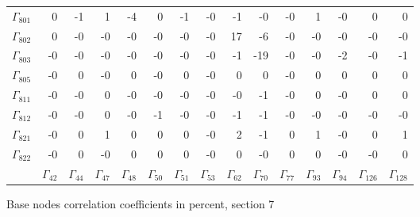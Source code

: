 {\begin{table}
\begin{center}
\begin{minipage}{\linewidth}
\begin{center}
\begin{envsmall}
\begin{center}
\begin{tabular}{rrrrrrrrrrrrrrr}
\( \Gamma_{801} \) &    0 &   -1 &    1 &   -4 &    0 &   -1 &   -0 &   -1 &   -0 &   -0 &    1 &   -0 &    0 &    0 \\
\( \Gamma_{802} \) &    0 &   -0 &   -0 &   -0 &   -0 &   -0 &   -0 &   17 &   -6 &   -0 &   -0 &   -0 &   -0 &   -0 \\
\( \Gamma_{803} \) &   -0 &   -0 &   -0 &   -0 &   -0 &   -0 &   -0 &   -1 &  -19 &   -0 &   -0 &   -2 &   -0 &   -1 \\
\( \Gamma_{805} \) &   -0 &    0 &   -0 &    0 &   -0 &    0 &   -0 &    0 &    0 &   -0 &    0 &    0 &    0 &    0 \\
\( \Gamma_{811} \) &   -0 &   -0 &    0 &   -0 &   -0 &   -0 &   -0 &   -0 &   -1 &   -0 &    0 &   -0 &    0 &    0 \\
\( \Gamma_{812} \) &   -0 &   -0 &    0 &   -0 &   -1 &   -0 &   -0 &   -1 &   -1 &   -0 &   -0 &   -0 &   -0 &   -0 \\
\( \Gamma_{821} \) &   -0 &    0 &    1 &    0 &    0 &    0 &   -0 &    2 &   -1 &    0 &    1 &   -0 &    0 &    1 \\
\( \Gamma_{822} \) &   -0 &    0 &   -0 &    0 &    0 &    0 &   -0 &    0 &   -0 &    0 &    0 &   -0 &   -0 &    0 \\
 & \( \Gamma_{42} \) & \( \Gamma_{44} \) & \( \Gamma_{47} \) & \( \Gamma_{48} \) & \( \Gamma_{50} \) & \( \Gamma_{51} \) & \( \Gamma_{53} \) & \( \Gamma_{62} \) & \( \Gamma_{70} \) & \( \Gamma_{77} \) & \( \Gamma_{93} \) & \( \Gamma_{94} \) & \( \Gamma_{126} \) & \( \Gamma_{128} \)
\\\hline
\end{tabular}
\end{center}
\end{envsmall}
\ifhevea\else
\end{center}
\end{minipage}
\fi
\end{center}
\ifhevea\end{table}\fi
\ifhevea\begin{table}\fi%
\begin{center}
\ifhevea
\caption{Base nodes correlation coefficients in percent, section 7\label{tab:tau:br-fit-corr7}}%
\else
\begin{minipage}{\linewidth}
\begin{center}
\label{tab:tau:br-fit-corr7}%
\fi
\begin{envsmall}

\end{envsmall}
\end{center}
\end{minipage}
\end{center}
\end{table}}
